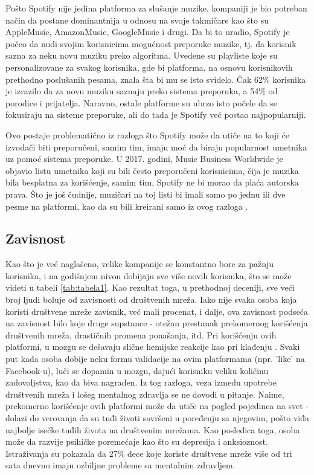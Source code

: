 \documentclass[a4paper]{article}
\begin{document}
Pošto Spotify nije jedina platforma za slušanje muzike, kompaniji je bio potreban način da postane dominantnija u odnosu na svoje takmičare kao što su AppleMusic, AmazonMusic, GoogleMusic i drugi. Da bi to uradio, Spotify je počeo da nudi svojim korisnicima mogućnost preporuke muzike, tj. da korisnik sazna za neku novu muziku preko algoritma. Uvedene su playliste koje su personalizovane za svakog korisnika, gde bi platforma, na osnovu korisnikovih prethodno poslušanih pesama, znala šta bi mu se isto svidelo. 
Čak 62\% korisnika je izrazilo da za novu muziku saznaju preko sistema preporuka, a 54\% od porodice i prijatelja. Naravno, ostale platforme su ubrzo isto počele da se fokusiraju na sisteme preporuke, ali do tada je Spotify već postao najpopularniji. 

Ovo postaje problematično iz razloga što Spotify može da utiče na to koji će izvođači biti preporučeni, samim tim, imaju moć da biraju popularnost umetnika uz pomoć sistema preporuke. U 2017. godini, Music Business Worldwide je objavio listu umetnika koji su bili često preporučeni korisnicima, čija je muzika bila besplatna za korišćenje, samim tim, Spotify ne bi morao da plaća autorska prava. Što je još čudnije, muzičari na toj listi bi imali samo po jednu ili dve pesme na platformi, kao da su bili kreirani samo iz ovog razloga \cite{spotify}.

 

\subsection{Zavisnost}
Kao što je već naglašeno, velike kompanije se konstantno bore za pažnju korisnika, i na godišnjem nivou dobijaju sve više novih korisnika, što se može videti u tabeli \ref{tab:tabela1}. Kao rezultat toga, u prethodnoj deceniji, sve veći broj ljudi boluje od zavisnosti od društvenih mreža. Iako nije svaka osoba koja koristi društvene mreže zavisnik, već mali procenat, i dalje, ova zavisnost podseća na zavisnost bilo koje druge supstance - otežan prestanak prekomernog korišćenja društvenih mreža, drastičnih promena ponašanja, itd. Pri korišćenju ovih platformi, u mozgu se dešavaju slične hemijske reakcije kao pri klađenju \cite{zavisnost}. Svaki put kada osoba dobije neku formu validacije na ovim platformama (npr. 'like' na Facebook-u), luči se dopamin u mozgu, dajući korisniku veliku količinu zadovoljstva, kao da biva nagrađen. Iz tog razloga, veza između upotrebe društvenih mreža i lošeg mentalnog zdravlja se ne dovodi u pitanje. Naime, prekomerno korišćenje ovih platformi može da utiče na pogled pojedinca na svet - dolazi do verovanja da su tuđi životi savršeni u poređenju sa njegovim, pošto viđa najbolje isečke tuđih života na društvenim mrežama. Kao posledica toga, osoba može da razvije psihičke poremećaje kao što su depresija i anksioznost. Istraživanja su pokazala da 27\% dece koje koriste društvene mreže više od tri sata dnevno imaju ozbiljne probleme sa mentalnim zdravljem.
\end{document}
